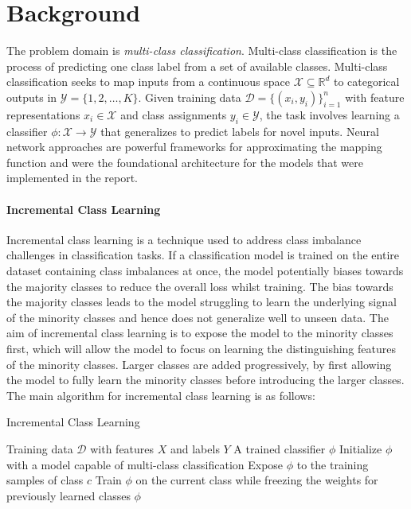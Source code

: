 \documentclass[conference]{IEEEtran}
\begin{document}
\section{Background}
The problem domain is \textit{multi-class classification}. Multi-class classification is the process of predicting one class label from a set of available classes.
Multi-class classification seeks to map inputs from a continuous space \(\mathcal{X} \subseteq \mathbb{R}^d\) 
to categorical outputs in \(\mathcal{Y} = \{1,2,\dots,K\}\). 
Given training data \(\mathcal{D} = \{(x_i, y_i)\}_{i=1}^n\) 
with feature representations \(x_i \in \mathcal{X}\) 
and class assignments \(y_i \in \mathcal{Y}\), 
the task involves learning a classifier 
\(\phi: \mathcal{X} \to \mathcal{Y}\) 
that generalizes to predict labels for novel inputs. Neural network approaches are powerful frameworks for approximating the mapping function and were the foundational architecture for the 
models that were implemented in the report.\\

\paragraph{Incremental Class Learning}
Incremental class learning is a technique used to address class imbalance challenges in classification tasks. If a classification model is 
trained on the entire dataset containing class imbalances at once, the model potentially biases towards the majority classes to reduce the overall loss whilst training. 
The bias towards the majority classes leads to the model struggling to learn the underlying signal of the minority classes and hence does not generalize well to unseen data. The aim 
of incremental class learning is to expose the model to the minority classes first, which will allow the model to focus on learning the distinguishing features 
of the minority classes. Larger classes are added progressively, by first allowing the model to fully learn the minority classes before introducing the larger classes. The main algorithm 
for incremental class learning is as follows:

\begin{algorithm}[H]
\caption{Incremental Class Learning}
\begin{algorithmic}[1]
\REQUIRE Training data $\mathcal{D}$ with features $X$ and labels $Y$
\ENSURE A trained classifier $\phi$
\STATE Initialize $\phi$ with a model capable of multi-class classification
    \STATE Expose $\phi$ to the training samples of class $c$
    \STATE Train $\phi$ on the current class while freezing the weights for previously learned classes
\ENDFOR
\RETURN $\phi$
\end{algorithmic}
\end{algorithm}
\end{document}
